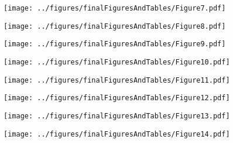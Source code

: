 \documentclass[12pt,english]{article}
\theoremstyle{remark}
\begin{document}
\begin{sidewaysfigure}
	\texttt{[image: ../figures/finalFiguresAndTables/Figure7.pdf]}
\end{sidewaysfigure}

\begin{sidewaysfigure}
	\texttt{[image: ../figures/finalFiguresAndTables/Figure8.pdf]}
\end{sidewaysfigure}

\begin{sidewaysfigure}
	\texttt{[image: ../figures/finalFiguresAndTables/Figure9.pdf]}
\end{sidewaysfigure}

\begin{sidewaysfigure}
	\texttt{[image: ../figures/finalFiguresAndTables/Figure10.pdf]}
\end{sidewaysfigure}

\begin{sidewaysfigure}
	\texttt{[image: ../figures/finalFiguresAndTables/Figure11.pdf]}
\end{sidewaysfigure}

\begin{sidewaysfigure}
	\texttt{[image: ../figures/finalFiguresAndTables/Figure12.pdf]}
\end{sidewaysfigure}

\begin{sidewaysfigure}
	\texttt{[image: ../figures/finalFiguresAndTables/Figure13.pdf]}
\end{sidewaysfigure}

\begin{sidewaysfigure}
	\texttt{[image: ../figures/finalFiguresAndTables/Figure14.pdf]}
\end{sidewaysfigure}
\end{document}
